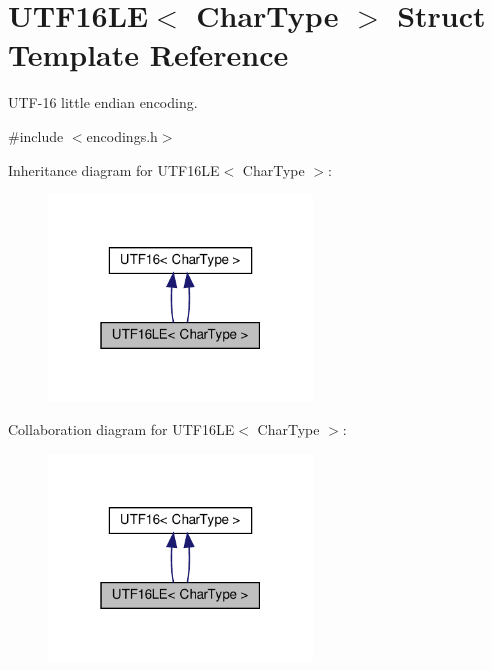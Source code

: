 \hypertarget{structUTF16LE}{}\section{U\+T\+F16\+LE$<$ Char\+Type $>$ Struct Template Reference}
\label{structUTF16LE}


U\+T\+F-\/16 little endian encoding.  




{\ttfamily \#include $<$encodings.\+h$>$}



Inheritance diagram for U\+T\+F16\+LE$<$ Char\+Type $>$\+:
\nopagebreak
\begin{figure}[H]
\begin{center}
\leavevmode
\includegraphics[width=199pt]{structUTF16LE__inherit__graph}
\end{center}
\end{figure}


Collaboration diagram for U\+T\+F16\+LE$<$ Char\+Type $>$\+:
\nopagebreak
\begin{figure}[H]
\begin{center}
\leavevmode
\includegraphics[width=199pt]{structUTF16LE__coll__graph}
\end{center}
\end{figure}
